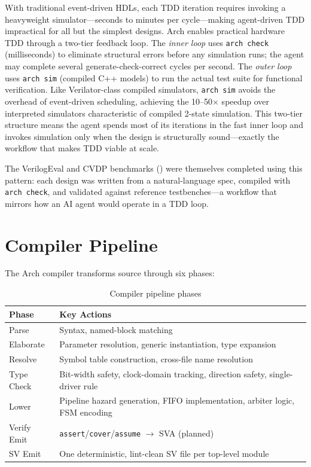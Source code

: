 \documentclass[11pt,twocolumn]{article}
\begin{document}
With traditional event-driven HDLs, each TDD iteration requires invoking a heavyweight simulator---seconds to minutes per cycle---making agent-driven TDD impractical for all but the simplest designs. Arch enables practical hardware TDD through a two-tier feedback loop. The \emph{inner loop} uses \texttt{arch check} (milliseconds) to eliminate structural errors before any simulation runs; the agent may complete several generate-check-correct cycles per second. The \emph{outer loop} uses \texttt{arch sim} (compiled C++ models) to run the actual test suite for functional verification. Like Verilator-class compiled simulators, \texttt{arch sim} avoids the overhead of event-driven scheduling, achieving the 10--50$\times$ speedup over interpreted simulators characteristic of compiled 2-state simulation. This two-tier structure means the agent spends most of its iterations in the fast inner loop and invokes simulation only when the design is structurally sound---exactly the workflow that makes TDD viable at scale.

The VerilogEval and CVDP benchmarks () were themselves completed using this pattern: each design was written from a natural-language spec, compiled with \texttt{arch check}, and validated against reference testbenches---a workflow that mirrors how an AI agent would operate in a TDD loop.

\section{Compiler Pipeline}\label{sec:compiler}

The Arch compiler transforms source through six phases:

\begin{table}[t]
\centering
\caption{Compiler pipeline phases}
\label{tab:compiler}
\small
\begin{tabular}{@{}lp{5cm}@{}}
\toprule
\textbf{Phase} & \textbf{Key Actions} \\
\midrule
Parse & Syntax, named-block matching \\
Elaborate & Parameter resolution, generic instantiation, type expansion \\
Resolve & Symbol table construction, cross-file name resolution \\
Type Check & Bit-width safety, clock-domain tracking, direction safety, single-driver rule \\
Lower & Pipeline hazard generation, FIFO implementation, arbiter logic, FSM encoding \\
Verify Emit & \texttt{assert}/\texttt{cover}/\texttt{assume} $\to$ SVA (planned) \\
SV Emit & One deterministic, lint-clean SV file per top-level module \\
\bottomrule
\end{tabular}
\end{table}
\end{document}
